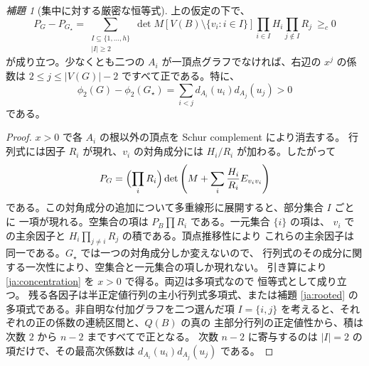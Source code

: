 \documentclass[12pt]{amsart}
\theoremstyle{definition}
\theoremstyle{remark}
\numberwithin{equation}{section}
\newtheorem{jlem}[thm]{補題}
\begin{document}
\begin{jlem}[集中に対する厳密な恒等式]\label{ja:concentrate}
上の仮定の下で、
\begin{equation}\label{ja:concentration}
 P_G-P_{G_\star}=
 \sum_{\substack{I\subseteq\{1,\ldots,h\}\\|I|\ge2}}
 \det M[V(B)\setminus\{v_i:i\in I\}]
 \prod_{i\in I}H_i\prod_{j\notin I}R_j\ \ge_c0
\end{equation}
が成り立つ。少なくとも二つの $A_i$ が一頂点グラフでなければ、右辺の
$x^j$ の係数は $2\le j\le |V(G)|-2$ ですべて正である。特に、
\[
 \phi_2(G)-\phi_2(G_\star)
   =\sum_{i<j}d_{A_i}(u_i)d_{A_j}(u_j)>0
\]
である。
\end{jlem}
\begin{proof}
$x>0$ で各 $A_i$ の根以外の頂点を Schur complement により消去する。
行列式には因子 $R_i$ が現れ、$v_i$ の対角成分には $H_i/R_i$ が加わる。したがって
\[
 P_G=\Bigl(\prod_iR_i\Bigr)
 \det\left(M+\sum_i\frac{H_i}{R_i}E_{v_iv_i}\right)
\]
である。この対角成分の追加について多重線形に展開すると、部分集合 $I$ ごとに
一項が現れる。空集合の項は $P_B\prod R_i$ である。一元集合 $\{i\}$ の項は、
$v_i$ での主余因子と $H_i\prod_{j\ne i}R_j$ の積である。頂点推移性により
これらの主余因子は同一である。$G_\star$ では一つの対角成分しか変えないので、
行列式のその成分に関する一次性により、空集合と一元集合の項しか現れない。
引き算により \eqref{ja:concentration} を $x>0$ で得る。両辺は多項式なので
恒等式として成り立つ。
残る各因子は半正定値行列の主小行列式多項式、または補題
\ref{ja:rooted} の多項式である。非自明な付加グラフを二つ選んだ項
$I=\{i,j\}$ を考えると、それぞれの正の係数の連続区間と、$Q(B)$ の真の
主部分行列の正定値性から、積は次数 $2$ から $n-2$ まですべてで正となる。
次数 $n-2$ に寄与するのは $|I|=2$ の項だけで、その最高次係数は
$d_{A_i}(u_i)d_{A_j}(u_j)$ である。
\end{proof}
\end{document}
